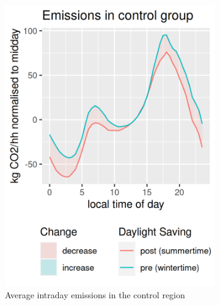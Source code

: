 \begin{figure}[ht]
    \centering
    \begin{subfigure}[t]{0.45\textwidth} 
        \includegraphics[width=\textwidth]{Images/intraday/co2_g_per_capita_vs_midday/by-treated/control/hr_local-filled.png}
        \caption{Average intraday emissions in the control region}
        \label{fig:intraday co2 control midday}
    \end{subfigure}
    \hfill 
    \begin{subfigure}[t]{0.45\textwidth} 

\end{subfigure}
\end{figure}
